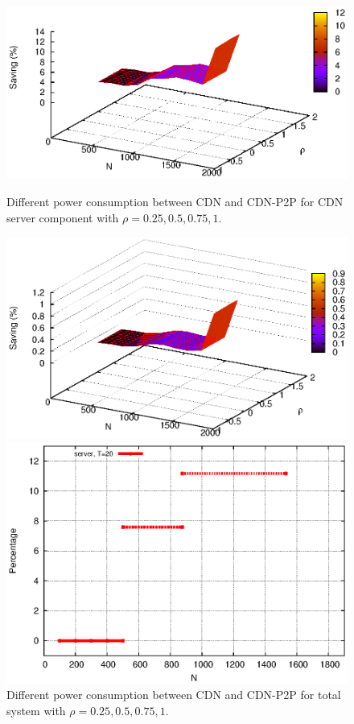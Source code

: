 \documentclass[JIP]{ipsj}
\begin{document}
\begin{figure}[ht!]
\centering
\begin{minipage}[b]{0.4\linewidth}
	\includegraphics[scale=0.5]{graphs/diff3dimension.eps}
	\caption{Different power consumption between CDN and CDN-P2P for CDN server component with $\rho=0.25,0.5,0.75,1$.}
	\label{fig:diff1}
\end{minipage}
\hfill
\begin{minipage}[b]{0.4\linewidth}
	\includegraphics[scale=0.5]{graphs/diff3dimension2.eps}
	\caption{Different power consumption between CDN and CDN-P2P for total system with $\rho=0.25,0.5,0.75,1$.}
	\label{fig:diff2}
\end{minipage}
\centering
\begin{minipage}[b]{0.4\linewidth}
	\includegraphics[scale=0.5]{graphs/diff-3.eps}

\end{minipage}
\end{figure}
\end{document}
